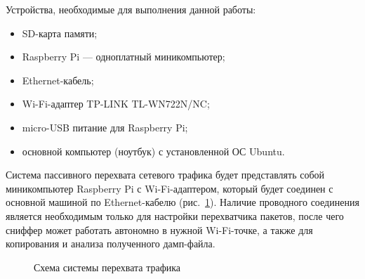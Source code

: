 Устройства, необходимые для выполнения данной работы:

\begin{itemize}
  \item SD-карта памяти;
  \item Raspberry Pi --- одноплатный миникомпьютер;
  \item Ethernet-кабель;
  \item Wi-Fi-адаптер TP-LINK TL-WN722N/NC;
  \item micro-USB питание для Raspberry Pi;
  \item основной компьютер (ноутбук) с установленной ОС Ubuntu.
\end{itemize}

Система пассивного перехвата сетевого трафика будет представлять собой миникомпьютер Raspberry Pi с Wi-Fi-адаптером, который будет соединен с основной машиной по Ethernet-кабелю (рис.~\ref{1:1}). Наличие проводного соединения является необходимым только для настройки перехватчика пакетов, после чего сниффер может работать автономно в нужной Wi-Fi-точке, а также для копирования и анализа полученного дамп-файла.

\begin{figure}[h!]
\center{\texttt{[image: 1]}}
\caption{ Схема системы перехвата трафика }
\label{1:1}
\end{figure}

